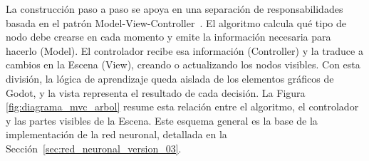 La construcción paso a paso se apoya en una separación de responsabilidades basada en el patrón Model-View-Controller~\cite{KrasnerPopeMVC}.
El algoritmo calcula qué tipo de \gls{nodo} debe crearse en cada momento y emite la información necesaria para hacerlo (Model). %
El controlador recibe esa información (Controller) y la traduce a cambios en la \gls{Escena} (View), creando o actualizando los \gls{nodo}s visibles.
Con esta división, la lógica de aprendizaje queda aislada de los elementos gráficos de Godot, y la vista representa el resultado de cada decisión.
La Figura \ref{fig:diagrama_mvc_arbol} resume esta relación entre el algoritmo, el controlador y las partes visibles de la \gls{Escena}.
Este esquema general es la base de la implementación de la red neuronal, detallada en la Sección~\ref{sec:red_neuronal_version_03}.

